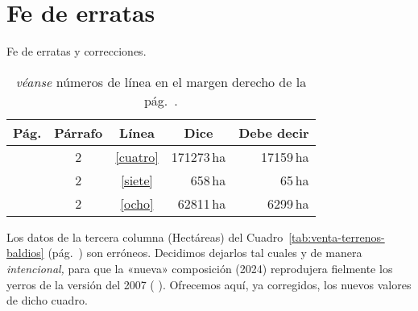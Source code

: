 \documentclass[14pt,twoside,final]{extbook} %
\newcommand{\lref}[1]{\hyperlink{llineno:#1}{\ref*{#1}}}
\begin{document}
\chapter{Fe de erratas}
\label{ap:fe-de-erratas}
\thispagestyle{empty}
\pagestyle{fancy}
\fancyhf{} %
\fancyhead[RO,LE]{\thepage}
\renewcommand{\headrulewidth}{0pt}
\begin{table}[H]
\centering
\caption{Fe de erratas y correcciones.}
\label{tab:fe-de-erratas-y-correcciones}
\tlfstyle
\begin{tabular}{@{}cccrr@{}}
\toprule
Pág. & Párrafo & Línea & \multicolumn{1}{c}{Dice} & Debe decir \\
\midrule
\pageref{para:errata}\textsu{*} & 2 & \lref{cuatro} & 171273\,ha & 17159\,ha \\
\pageref{para:errata}\textsu{*} & 2 & \lref{siete} & 658\,ha & 65\,ha \\
\pageref{para:errata}\textsu{*} & 2 & \lref{ocho} & 62811\,ha & 6299\,ha \\
\bottomrule
\end{tabular}
\caption*{\textsu{*} \emph{véanse} números de línea en el margen derecho de la pág.~\pageref{para:errata}.}
\end{table}
Los datos de la tercera columna (Hectáreas) del Cuadro~\ref{tab:venta-terrenos-baldios} (pág.~\pageref{tab:venta-terrenos-baldios}) son erróneos. Decidimos dejarlos tal cuales y de manera \emph{intencional,} para que la «nueva» composición (2024) reprodujera fielmente los yerros de la versión del 2007 ( ). Ofrecemos aquí, ya corregidos, los nuevos valores de dicho cuadro.
\end{document}
